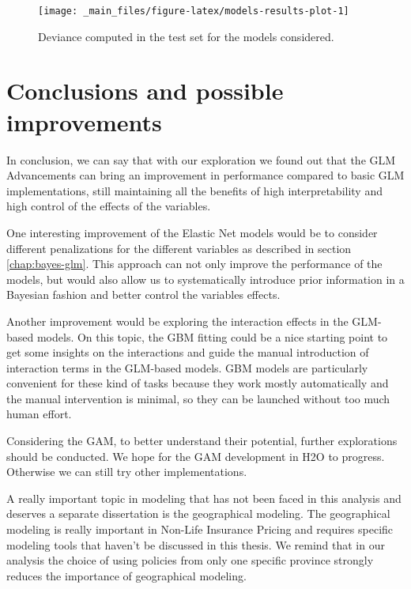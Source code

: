 \documentclass[a4paper, twoside, openright, 12pt]{report}
\theoremstyle{definition}
\theoremstyle{definition}
\theoremstyle{definition}
\theoremstyle{remark}
\begin{document}
\begin{figure}[!hbtp]

{\centering \texttt{[image: \_main\_files/figure-latex/models-results-plot-1]} 

}

\caption[Deviance computed in the test set for the models considered.]{Deviance computed in the test set for the models considered.}\label{fig:models-results-plot}
\end{figure}

\newpage

\hypertarget{chap:conclusions}{%
\section{Conclusions and possible improvements}\label{chap:conclusions}}

In conclusion, we can say that with our exploration we found out that the GLM Advancements can bring an improvement in performance compared to basic GLM implementations, still maintaining all the benefits of high interpretability and high control of the effects of the variables.

One interesting improvement of the Elastic Net models would be to consider different penalizations for the different variables as described in section \ref{chap:bayes-glm}. This approach can not only improve the performance of the models, but would also allow us to systematically introduce prior information in a Bayesian fashion and better control the variables effects.

Another improvement would be exploring the interaction effects in the GLM-based models. On this topic, the GBM fitting could be a nice starting point to get some insights on the interactions and guide the manual introduction of interaction terms in the GLM-based models. GBM models are particularly convenient for these kind of tasks because they work mostly automatically and the manual intervention is minimal, so they can be launched without too much human effort.

Considering the GAM, to better understand their potential, further explorations should be conducted. We hope for the GAM development in H2O to progress. Otherwise we can still try other implementations.

A really important topic in modeling that has not been faced in this analysis and deserves a separate dissertation is the geographical modeling. The geographical modeling is really important in Non-Life Insurance Pricing and requires specific modeling tools that haven't be discussed in this thesis. We remind that in our analysis the choice of using policies from only one specific province strongly reduces the importance of geographical modeling.
\end{document}
